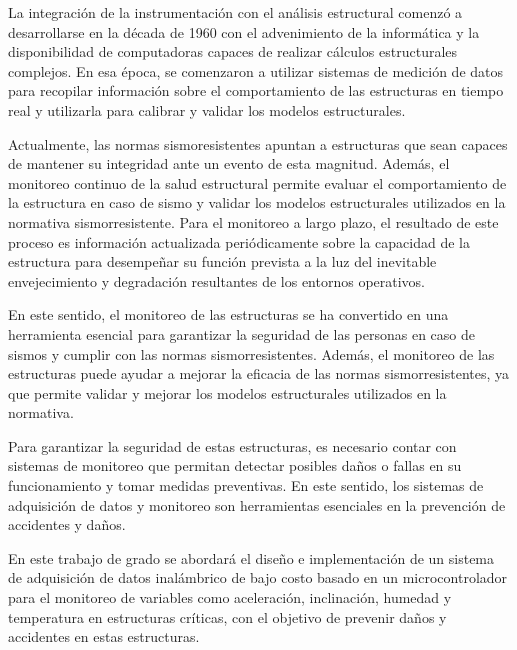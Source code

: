 \documentclass[12pt,letterpaper]{article}
\begin{document}
La integración de la instrumentación con el análisis estructural comenzó a desarrollarse en la década de 1960 con el advenimiento de la informática y la disponibilidad de computadoras capaces de realizar cálculos estructurales complejos. En esa época, se comenzaron a utilizar sistemas de medición de datos para recopilar información sobre el comportamiento de las estructuras en tiempo real y utilizarla para calibrar y validar los modelos estructurales.

Actualmente, las normas sismoresistentes apuntan a estructuras que sean capaces de mantener su integridad ante un evento de esta magnitud. Además, el monitoreo continuo de la salud estructural permite evaluar el comportamiento de la estructura en caso de sismo y validar los modelos estructurales utilizados en la normativa sismorresistente. Para el monitoreo a largo plazo, el resultado de este proceso es información actualizada periódicamente sobre la capacidad de la estructura para desempeñar su función prevista a la luz del inevitable envejecimiento y degradación resultantes de los entornos operativos.

En este sentido, el monitoreo de las estructuras se ha convertido en una herramienta esencial para garantizar la seguridad de las personas en caso de sismos y cumplir con las normas sismorresistentes. Además, el monitoreo de las estructuras puede ayudar a mejorar la eficacia de las normas sismorresistentes, ya que permite validar y mejorar los modelos estructurales utilizados en la normativa.

Para garantizar la seguridad de estas estructuras, es necesario contar con sistemas de monitoreo que permitan detectar posibles daños o fallas en su funcionamiento y tomar medidas preventivas. En este sentido, los sistemas de adquisición de datos y monitoreo son herramientas esenciales en la prevención de accidentes y daños. 

En este trabajo de grado se abordará el diseño e implementación de un sistema de adquisición de datos inalámbrico de bajo costo basado en un microcontrolador para el monitoreo de variables como aceleración, inclinación, humedad y temperatura en estructuras críticas, con el objetivo de prevenir daños y accidentes en estas estructuras.


\end{document}
